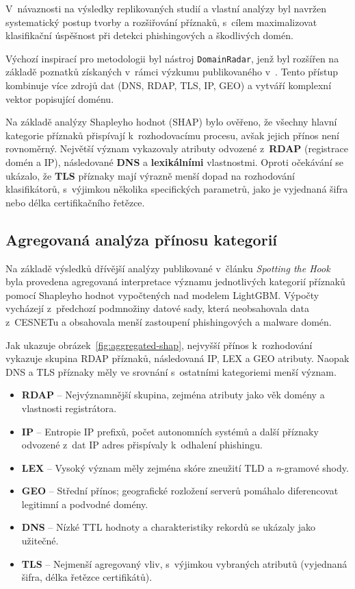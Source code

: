 V~návaznosti na výsledky replikovaných studií a vlastní analýzy byl navržen systematický postup tvorby a rozšiřování příznaků, s~cílem maximalizovat klasifikační úspěšnost při detekci phishingových a škodlivých domén.

Výchozí inspirací pro metodologii byl nástroj \texttt{DomainRadar}, jenž byl rozšířen na základě poznatků získaných v~rámci výzkumu publikovaného v~\cite{CNSM}. Tento přístup kombinuje více zdrojů dat (DNS, RDAP, TLS, IP, GEO) a vytváří komplexní vektor popisující doménu.

Na základě analýzy Shapleyho hodnot (SHAP) bylo ověřeno, že všechny hlavní kategorie příznaků přispívají k~rozhodovacímu procesu, avšak jejich přínos není rovnoměrný. Největší význam vykazovaly atributy odvozené z~\textbf{RDAP} (registrace domén a IP), následované \textbf{DNS} a \textbf{lexikálními} vlastnostmi. Oproti očekávání se ukázalo, že \textbf{TLS} příznaky mají výrazně menší dopad na rozhodování klasifikátorů, s~výjimkou několika specifických parametrů, jako je vyjednaná šifra nebo délka certifikačního řetězce.

\subsection{Agregovaná analýza přínosu kategorií}

Na základě výsledků dřívější analýzy publikované v~článku \textit{Spotting the Hook}~\cite{CNSM} byla provedena agregovaná interpretace významu jednotlivých kategorií příznaků pomocí Shapleyho hodnot vypočtených nad modelem LightGBM. Výpočty vycházejí z~předchozí podmnožiny datové sady, která neobsahovala data z~CESNETu a obsahovala menší zastoupení phishingových a malware domén.

Jak ukazuje obrázek~\ref{fig:aggregated-shap}, nejvyšší přínos k~rozhodování vykazuje skupina RDAP příznaků, následovaná IP, LEX a GEO atributy. Naopak DNS a TLS příznaky měly ve srovnání s~ostatními kategoriemi menší význam.


\begin{itemize}
    \item \textbf{RDAP} – Nejvýznamnější skupina, zejména atributy jako věk domény a vlastnosti registrátora.
    \item \textbf{IP} – Entropie IP prefixů, počet autonomních systémů a další příznaky odvozené z~dat IP adres přispívaly k~odhalení phishingu.
    \item \textbf{LEX} – Vysoký význam měly zejména skóre zneužití TLD a \textit{n}-gramové shody.
    \item \textbf{GEO} – Střední přínos; geografické rozložení serverů pomáhalo diferencovat legitimní a podvodné domény.
    \item \textbf{DNS} – Nízké TTL hodnoty a charakteristiky rekordů se ukázaly jako užitečné.
    \item \textbf{TLS} – Nejmenší agregovaný vliv, s~výjimkou vybraných atributů (vyjednaná šifra, délka řetězce certifikátů).
\end{itemize}

